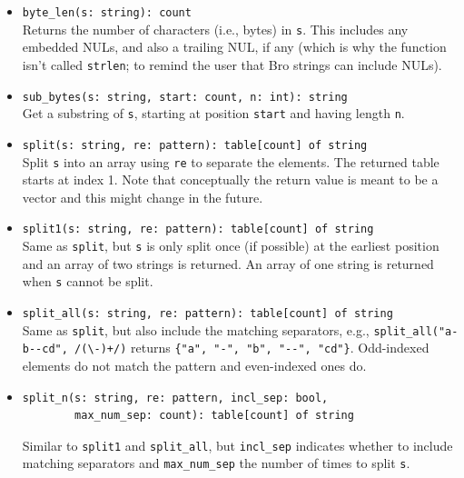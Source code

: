 \documentclass[10pt,landscape]{article}
\begin{document}
\begin{multicols*}{2}
\begin{itemize}
  \item \verb|byte_len(s: string): count|\\
    Returns the number of characters (i.e., bytes) in \texttt{s}.  This
    includes any embedded NULs, and also a trailing NUL, if any (which is why
    the function isn't called \verb|strlen|; to remind the user that Bro
    strings can include NULs).
  \item \verb|sub_bytes(s: string, start: count, n: int): string|\\
    Get a substring of \texttt{s}, starting at position \texttt{start} and
    having length \texttt{n}.
  \item \verb|split(s: string, re: pattern): table[count] of string|\\
    Split \texttt{s} into an array using \texttt{re} to separate the elements.
    The returned table starts at index 1. Note that conceptually the return
    value is meant to be a vector and this might change in the future.
  \item \verb|split1(s: string, re: pattern): table[count] of string|\\
    Same as \texttt{split}, but \texttt{s} is only split once (if possible) at
    the earliest position and an array of two strings is returned. An array of
    one string is returned when \texttt{s} cannot be split.
  \item \verb|split_all(s: string, re: pattern): table[count] of string|\\
    Same as \texttt{split}, but also include the matching separators, e.g.,
    \verb|split_all("a-b--cd", /(\-)+/)| returns
    \verb|{"a", "-", "b", "--", "cd"}|. Odd-indexed elements do not match the
    pattern and even-indexed ones do.
  \item
\begin{verbatim}
split_n(s: string, re: pattern, incl_sep: bool,
        max_num_sep: count): table[count] of string
\end{verbatim}
    Similar to \verb|split1| and \verb|split_all|, but \verb|incl_sep|
    indicates whether to include matching separators and \verb|max_num_sep| the
    number of times to split \texttt{s}.

\end{itemize}
\end{multicols*}
\end{document}
